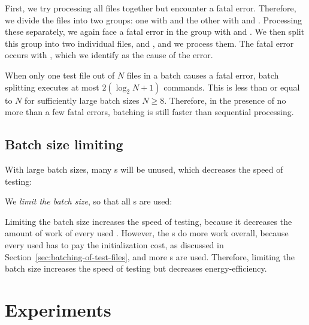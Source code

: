 \documentclass[final]{ltugboat}
\begin{document}
\medskip
\noindent
\begingroup
\centering

\par
\endgroup

\medskip
\noindent
First, we try processing all files together but encounter a fatal error. Therefore, we divide the files into two groups: one with  and the other with  and . Processing these separately, we again face a fatal error in the group with  and . We then split this group into two individual files,  and , and we process them. The fatal error occurs with , which we identify as the cause of the error.

When only one test file out of $N$ files in a batch causes a fatal error, batch splitting executes at most $2 (\log_2 N + 1)$ commands. This is less than or equal to $N$ for sufficiently large batch sizes $N\geq 8$. Therefore, in the presence of no more than a few fatal errors, batching is still faster than sequential processing.

\subsection{Batch size limiting}

With large batch sizes, many s will be unused, which decreases the speed of testing:

\smallskip
\noindent
\begingroup
\centering

\par
\endgroup

\smallskip
\noindent
We \emph{limit the batch size}, so that all s are used:

\smallskip
\noindent
\begingroup
\centering

\par
\endgroup

\smallskip
{}
Limiting the batch size increases the speed of testing, because it decreases the amount of work of every used . However, the s do more work overall, because every used  has to pay the initialization cost, as discussed in Section~\ref{sec:batching-of-test-files}, and more s are used. Therefore, limiting the batch size increases the speed of testing but decreases energy-efficiency.

\section{Experiments}
\label{sec:experiments}
\end{document}
